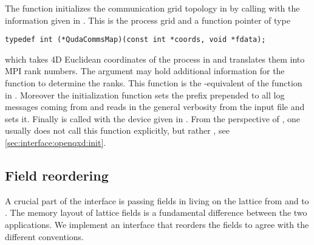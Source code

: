 The function initializes the communication grid topology in \quda by calling  with the information given in . This is the process grid and a function pointer of type
\begin{verbatim}
typedef int (*QudaCommsMap)(const int *coords, void *fdata);
\end{verbatim}
which takes 4D Euclidean coordinates of the process in \quda and translates them into MPI rank numbers. The argument  may hold additional information for the function to determine the ranks. This function is the \quda-equivalent of the function  in \openqxd. Moreover the initialization function sets the prefix prepended to all log messages coming from \quda and reads in the general verbosity from the input file and sets it. Finally  is called with the device given in . From the perspective of \openqxd, one usually does not call this function explicitly, but rather , see \cref{sec:interface:openqxd:init}.

\subsection{Field reordering}
\label{sec:interface:field_reordering}

A crucial part of the interface is passing fields in \openqxd living on the lattice from and to \quda.
The memory layout of lattice fields is a fundamental difference between the two applications.
We implement an interface that reorders the fields to agree with the different conventions.


